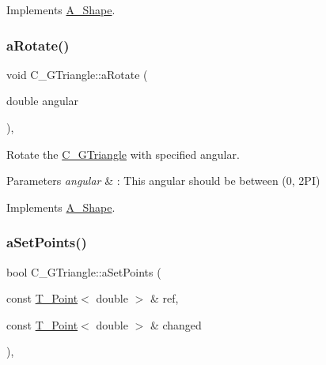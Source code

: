 Implements \hyperlink{classA__Shape_a25b4e0c34cdb46da5382fe9c7467efaf}{A\+\_\+\+Shape}.

\mbox{\label{classC__GTriangle_a29c641aea4ef5fa4224b42dffc5fefa5}} 
\subsubsection{\texorpdfstring{a\+Rotate()}{aRotate()}\hspace{0.1cm}{\footnotesize\ttfamily [2/2]}}
{\footnotesize\ttfamily void C\+\_\+\+G\+Triangle\+::a\+Rotate (\begin{DoxyParamCaption}\item[{double}]{angular }\end{DoxyParamCaption})\hspace{0.3cm}{\ttfamily [override]}, {\ttfamily [virtual]}}



Rotate the \hyperlink{classC__GTriangle}{C\+\_\+\+G\+Triangle} with specified angular. 


\begin{DoxyParams}{Parameters}
{\em angular} & \+: This angular should be between (0, 2\+PI) \\
\hline
\end{DoxyParams}


Implements \hyperlink{classA__Shape_a25b4e0c34cdb46da5382fe9c7467efaf}{A\+\_\+\+Shape}.

\mbox{\label{classC__GTriangle_a18c134ddf90bc4f5729064a47094068b}} 
\subsubsection{\texorpdfstring{a\+Set\+Points()}{aSetPoints()}\hspace{0.1cm}{\footnotesize\ttfamily [1/2]}}
{\footnotesize\ttfamily bool C\+\_\+\+G\+Triangle\+::a\+Set\+Points (\begin{DoxyParamCaption}\item[{const \hyperlink{classT__Point}{T\+\_\+\+Point}$<$ double $>$ \&}]{ref,  }\item[{const \hyperlink{classT__Point}{T\+\_\+\+Point}$<$ double $>$ \&}]{changed }\end{DoxyParamCaption})\hspace{0.3cm}{\ttfamily [override]}, {\ttfamily [virtual]}}



